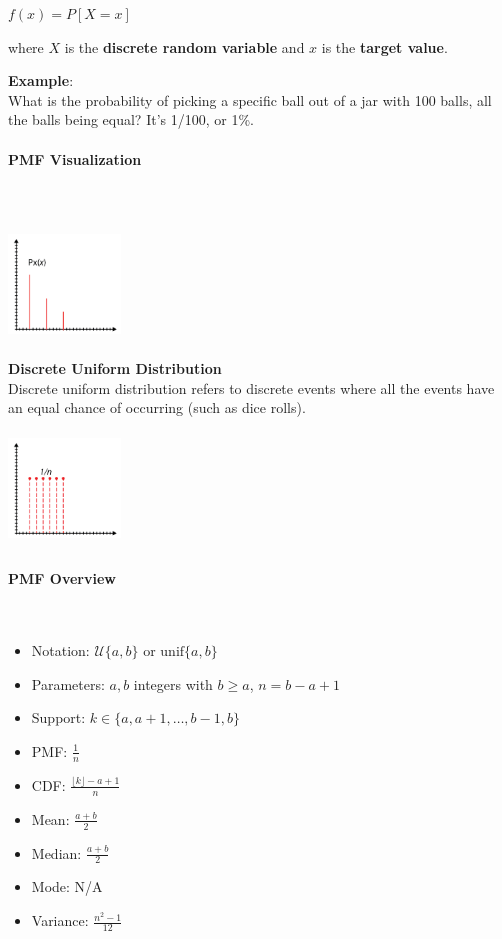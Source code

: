 \documentclass{article}
\begin{document}
$f(x) = P[X = x]$

where $X$ is the \textbf{discrete random variable} and $x$ is the \textbf{target value}.

\textbf{Example}:\\ 

What is the probability of picking a specific ball out of a jar with 100 balls, all the balls being equal? 
It’s 1/100, or 1\%.

\paragraph{PMF Visualization}\mbox{} \\
\mbox{} \\

\includegraphics[width=3cm, height=3cm]{pmf}

\textbf{Discrete Uniform Distribution} \\ 
Discrete uniform distribution refers to discrete events where all the events have an equal chance of occurring (such as dice rolls).

\includegraphics[width=3cm, height=3cm]{dud}

\paragraph{PMF Overview}\mbox{} \\

\begin{itemize}
    \item Notation: $\displaystyle {\mathcal{U}}\{a,b\}$ or $\displaystyle \text{unif} \{a,b\}$
    \item Parameters: $\displaystyle a,b$ integers with $\displaystyle b\geq a$, $\displaystyle n=b-a+1$
    \item Support: $\displaystyle k\in \{a,a+1,\dots ,b-1,b\}$
    \item PMF: $\displaystyle {\frac {1}{n}}$
    \item CDF: $\displaystyle {\frac {\lfloor k\rfloor -a+1}{n}}$ 
    \item Mean: $\displaystyle {\frac {a+b}{2}}$ 
    \item Median: $\displaystyle {\frac {a+b}{2}}$
    \item Mode:	N/A
    \item Variance: $\displaystyle {\frac {n^{2}-1}{12}}$
\end{itemize}
\end{document}
